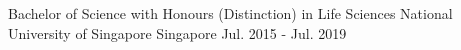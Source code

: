 

\begin{cventries}

  \cveducation
    {Bachelor of Science with Honours (Distinction) in Life Sciences} %
    {National University of Singapore} %
    {Singapore} %
    {Jul. 2015 - Jul. 2019} %
    {}
\end{cventries}
